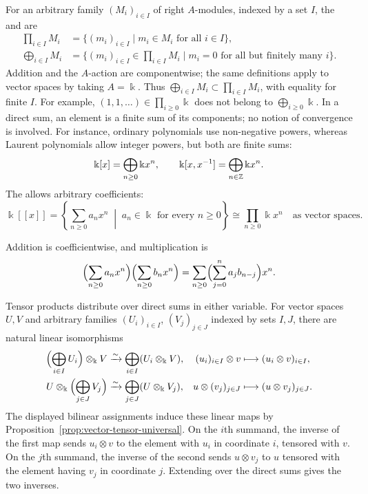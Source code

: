 For an arbitrary family $(M_i)_{i\in I}$ of right $A$-modules, indexed by a set $I$, the  and  are
\[
\begin{aligned}
\prod_{i\in I}M_i&=\{(m_i)_{i\in I}\mid m_i\in M_i\text{ for all }i\in I\},\\
\bigoplus_{i\in I}M_i&=\{(m_i)_{i\in I}\in\prod_{i\in I}M_i\mid m_i=0\text{ for all but finitely many }i\}.
\end{aligned}
\]
Addition and the $A$-action are componentwise; the same definitions apply to vector spaces by taking $A=\Bbbk$.
Thus $\bigoplus_{i\in I} M_i\subset\prod_{i\in I} M_i$, with equality for finite $I$.
For example, $(1,1,\ldots)\in\prod_{i\geq0}\Bbbk$ does not belong to $\bigoplus_{i\geq0}\Bbbk$.
In a direct sum, an element is a finite sum of its components; no notion of convergence is involved.
For instance, ordinary polynomials use non-negative powers, whereas Laurent polynomials allow integer powers, but both are finite sums:
\[
\Bbbk[x]=\bigoplus_{n\geq0}\Bbbk x^n,\qquad
\Bbbk[x,x^{-1}]=\bigoplus_{n\in\mathbb{Z}}\Bbbk x^n.
\]
\label{not:formal-power-series}
The  allows arbitrary coefficients:
\[
\Bbbk[[x]]=\left\{\sum_{n\geq0}a_nx^n\;\middle|\;a_n\in\Bbbk\text{ for every }n\geq0\right\}
\cong\prod_{n\geq0}\Bbbk x^n
\quad\text{as vector spaces}.
\]
\begin{supplementary}
Addition is coefficientwise, and multiplication is
\[
\Bigl(\sum_{n\geq0}a_nx^n\Bigr)\Bigl(\sum_{n\geq0}b_nx^n\Bigr)
=\sum_{n\geq0}\Bigl(\sum_{j=0}^n a_jb_{n-j}\Bigr)x^n.
\]
\end{supplementary}


Tensor products distribute over direct sums in either variable.
For vector spaces $U,V$ and arbitrary families $(U_i)_{i\in I}$, $(V_j)_{j\in J}$ indexed by sets $I,J$, there are natural linear isomorphisms
\begin{equation}\label{eq:vector-tensor-sums}
\begin{aligned}
\Bigl(\bigoplus_{i\in I}U_i\Bigr)\otimes_\Bbbk V
&\xrightarrow{\sim}\bigoplus_{i\in I}(U_i\otimes_\Bbbk V),
& (u_i)_{i\in I}\otimes v&\longmapsto(u_i\otimes v)_{i\in I},\\
U\otimes_\Bbbk\Bigl(\bigoplus_{j\in J}V_j\Bigr)
&\xrightarrow{\sim}\bigoplus_{j\in J}(U\otimes_\Bbbk V_j),
& u\otimes(v_j)_{j\in J}&\longmapsto(u\otimes v_j)_{j\in J}.
\end{aligned}
\end{equation}
The displayed bilinear assignments induce these linear maps by Proposition~\ref{prop:vector-tensor-universal}.
On the $i$th summand, the inverse of the first map sends $u_i\otimes v$ to the element with $u_i$ in coordinate $i$, tensored with $v$.
On the $j$th summand, the inverse of the second sends $u\otimes v_j$ to $u$ tensored with the element having $v_j$ in coordinate $j$.
Extending over the direct sums gives the two inverses.

